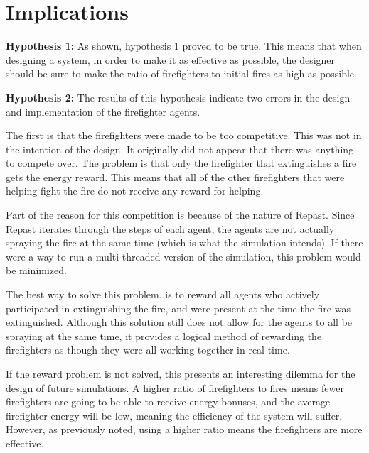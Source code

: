 \documentclass{article}
\begin{document}
\section{Implications}

  \begin{description}
    \item \textbf{Hypothesis 1:}
      As shown, hypothesis 1 proved to be true. This means that when designing
      a system, in order to make it as effective as possible, the designer
      should be sure to make the ratio of firefighters to initial fires as
      high as possible.

    \item \textbf{Hypothesis 2:}
      The results of this hypothesis indicate two errors in the design and
      implementation of the firefighter agents.

      The first is that the firefighters were made to be too competitive.
      This was not in the intention of the design.  It originally did not
      appear that there was anything to compete over. The problem is that
      only the firefighter that extinguishes a fire gets the energy reward.
      This means that all of the other firefighters that were helping
      fight the fire do not receive any reward for helping.

      Part of the reason for this competition is because of the nature of
      Repast. Since Repast iterates through the steps of each agent, the
      agents are not actually spraying the fire at the same time (which is
      what the simulation intends). If there were a way to run a multi-threaded
      version of the simulation, this problem would be minimized.

      The best way to solve this problem, is to reward all agents who
      actively participated in extinguishing the fire, and were present at
      the time the fire was extinguished. Although this solution still does
      not allow for the agents to all be spraying at the same time, it provides
      a logical method of rewarding the firefighters as though they were all
      working together in real time.

      If the reward problem is not solved, this presents an interesting
      dilemma for the design of future simulations. A higher ratio of
      firefighters to fires means fewer firefighters are going to be
      able to receive energy bonuses, and the average firefighter energy will
      be low, meaning the efficiency of the system will suffer.
      However, as previously noted, using a higher ratio means the
      firefighters are more effective.


\end{description}
\end{document}
